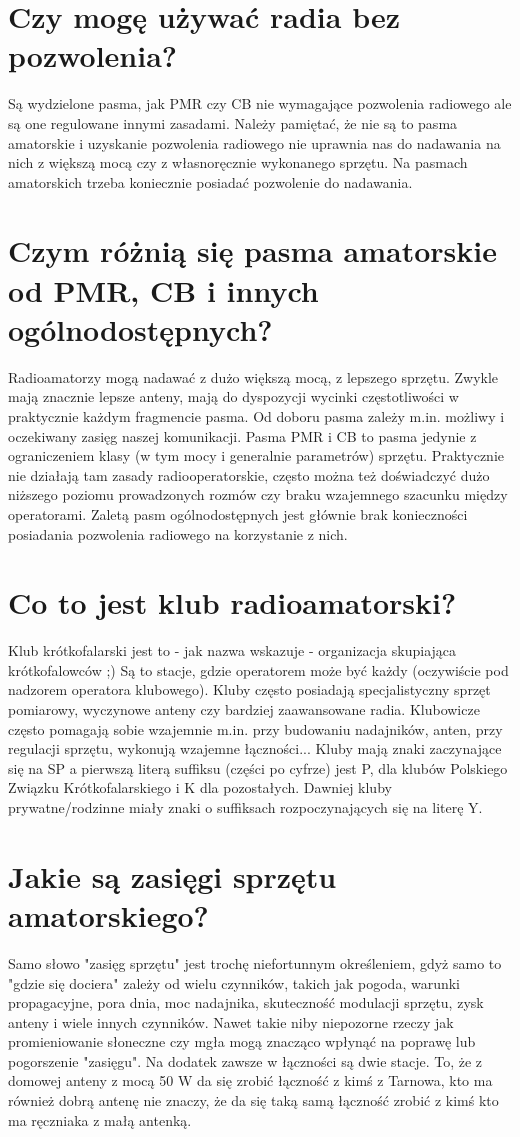 \documentclass[a4paper,12pt]{article}
\begin{document}
\section{Czy mogę używać radia bez pozwolenia?}
Są wydzielone pasma, jak PMR czy CB nie wymagające pozwolenia radiowego ale są one regulowane innymi zasadami. Należy pamiętać, że nie są to pasma amatorskie i uzyskanie pozwolenia radiowego nie uprawnia nas do nadawania na nich z większą mocą czy z własnoręcznie wykonanego sprzętu. Na pasmach amatorskich trzeba koniecznie posiadać pozwolenie do nadawania.

\section{Czym różnią się pasma amatorskie od PMR, CB i innych ogólnodostępnych?}
Radioamatorzy mogą nadawać z dużo większą mocą, z lepszego sprzętu. Zwykle mają znacznie lepsze anteny, mają do dyspozycji wycinki częstotliwości w praktycznie każdym fragmencie pasma.
Od doboru pasma zależy m.in. możliwy i oczekiwany zasięg naszej komunikacji. Pasma PMR i CB to pasma jedynie z ograniczeniem klasy (w tym mocy i generalnie parametrów) sprzętu. Praktycznie nie działają tam zasady radiooperatorskie, często można też doświadczyć dużo niższego poziomu prowadzonych rozmów czy braku wzajemnego szacunku między operatorami. Zaletą pasm ogólnodostępnych jest głównie brak konieczności posiadania pozwolenia radiowego na korzystanie z nich.

\section{Co to jest klub radioamatorski?}
Klub krótkofalarski jest to - jak nazwa wskazuje - organizacja skupiająca krótkofalowców ;) Są to stacje, gdzie operatorem może być każdy (oczywiście pod nadzorem operatora klubowego). Kluby często posiadają specjalistyczny sprzęt pomiarowy, wyczynowe anteny czy bardziej zaawansowane radia. Klubowicze często pomagają sobie wzajemnie m.in. przy budowaniu nadajników, anten, przy regulacji sprzętu, wykonują wzajemne łączności...
Kluby mają znaki zaczynające się na SP a pierwszą literą suffiksu (części po cyfrze) jest P, dla klubów Polskiego Związku Krótkofalarskiego i K dla pozostałych. Dawniej kluby prywatne/rodzinne miały znaki o suffiksach rozpoczynających się na literę Y. 

\section{Jakie są zasięgi sprzętu amatorskiego?}
Samo słowo "zasięg sprzętu" jest trochę niefortunnym określeniem, gdyż samo to "gdzie się dociera" zależy od wielu czynników, takich jak pogoda, warunki propagacyjne, pora dnia, moc nadajnika, skuteczność modulacji sprzętu, zysk anteny i wiele innych czynników. Nawet takie niby niepozorne rzeczy jak promieniowanie słoneczne czy mgła mogą znacząco wpłynąć na poprawę lub pogorszenie "zasięgu".
Na dodatek zawsze w łączności są dwie stacje. To, że z domowej anteny z mocą 50 W da się zrobić łączność z kimś z Tarnowa, kto ma również dobrą antenę nie znaczy, że da się taką samą łączność zrobić z kimś kto ma ręczniaka z małą antenką. 
\end{document}
